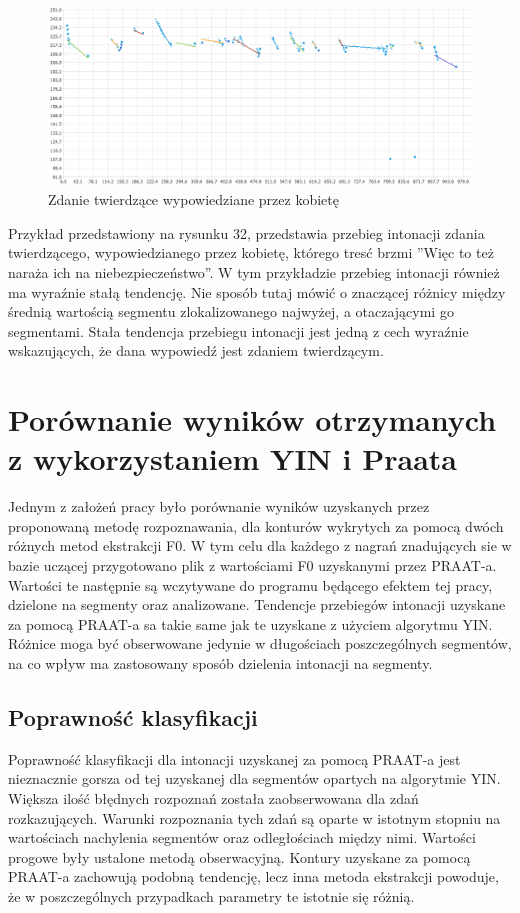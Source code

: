 \documentclass[a4paper,12 pt]{report}
\begin{document}
\begin{figure}[h]
\centering
\includegraphics[scale=0.7]{twierdzenie_3_kobieta.png}
\caption{Zdanie twierdzące wypowiedziane przez kobietę}
\end{figure}
\FloatBarrier
Przykład przedstawiony na rysunku 32, przedstawia przebieg intonacji zdania twierdzącego, wypowiedzianego przez kobietę, którego tresć brzmi ''Więc to też naraża ich na niebezpieczeństwo''. W tym przykładzie przebieg intonacji również ma wyraźnie stałą tendencję. Nie sposób tutaj mówić o znaczącej różnicy między średnią wartością segmentu zlokalizowanego najwyżej, a otaczającymi go segmentami. Stała tendencja przebiegu intonacji jest jedną z cech wyraźnie wskazujących, że dana wypowiedź jest zdaniem twierdzącym.

 
\section{Porównanie wyników otrzymanych z wykorzystaniem YIN i Praata}
Jednym z założeń pracy było porównanie wyników uzyskanych przez proponowaną metodę rozpoznawania, dla konturów wykrytych za pomocą dwóch różnych metod ekstrakcji F0. W tym celu dla każdego z nagrań znadujących sie w bazie uczącej przygotowano plik z wartościami F0 uzyskanymi przez PRAAT-a. Wartości te następnie są wczytywane do programu będącego efektem tej pracy, dzielone na segmenty oraz analizowane.
Tendencje przebiegów intonacji uzyskane za pomocą PRAAT-a sa takie same jak te uzyskane z użyciem algorytmu YIN. Różnice moga być obserwowane jedynie w długościach poszczególnych segmentów, na co wpływ ma zastosowany sposób dzielenia intonacji na segmenty.

\subsection{Poprawność klasyfikacji}

Poprawność klasyfikacji dla intonacji uzyskanej za pomocą PRAAT-a jest nieznacznie gorsza od tej uzyskanej dla segmentów opartych na algorytmie YIN. Większa ilość błędnych rozpoznań została zaobserwowana dla zdań rozkazujących. Warunki rozpoznania tych zdań są oparte w istotnym stopniu na wartościach nachylenia segmentów oraz odległościach między nimi. Wartości progowe były ustalone metodą obserwacyjną. Kontury uzyskane za pomocą PRAAT-a zachowują podobną tendencję, lecz inna metoda ekstrakcji powoduje, że w poszczególnych przypadkach parametry te istotnie się różnią.
\end{document}
